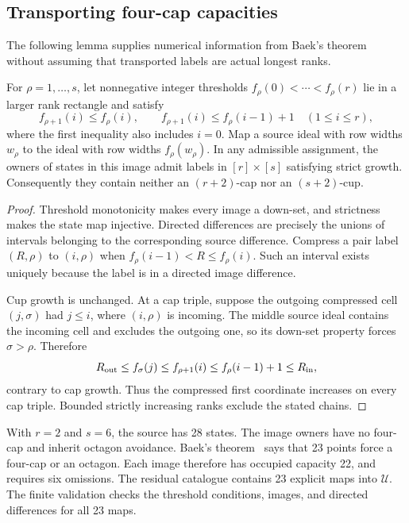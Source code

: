 \subsection{Transporting four-cap capacities}\label{sec:compression}
The following lemma supplies numerical information from Baek's theorem
without assuming that transported labels are actual longest ranks.

\begin{lemma}\label{lem:compression}
For $\rho=1,\ldots,s$, let nonnegative integer thresholds
$f_\rho(0)<\cdots<f_\rho(r)$ lie in a larger rank rectangle and satisfy
\[
 f_{\rho+1}(i)\le f_\rho(i),\qquad
 f_{\rho+1}(i)\le f_\rho(i-1)+1\quad(1\le i\le r),
\]
where the first inequality also includes $i=0$. Map a source ideal
with row widths $w_\rho$ to the ideal with row widths $f_\rho(w_\rho)$.
In any admissible assignment, the owners of states in this image
admit labels in $[r]\times[s]$ satisfying strict growth. Consequently
they contain neither an $(r+2)$-cap nor an $(s+2)$-cup.
\end{lemma}
\begin{proof}
Threshold monotonicity makes every image a down-set, and strictness
makes the state map injective. Directed differences are precisely the
unions of intervals belonging to the corresponding source difference.
Compress a pair label $(R,\rho)$ to $(i,\rho)$ when
$f_\rho(i-1)<R\le f_\rho(i)$. Such an interval exists uniquely because
the label is in a directed image difference.

Cup growth is unchanged. At a cap triple, suppose the outgoing
compressed cell $(j,\sigma)$ had $j\le i$, where $(i,\rho)$ is incoming.
The middle source ideal contains the incoming cell and excludes the
outgoing one, so its down-set property forces $\sigma>\rho$. Therefore
\[
 R_{\rm out}\le f_\sigma(j)\le f_{\rho+1}(i)
 \le f_\rho(i-1)+1\le R_{\rm in},
\]
contrary to cap growth. Thus the compressed first coordinate increases
on every cap triple. Bounded strictly increasing ranks exclude the
stated chains.
\end{proof}

With $r=2$ and $s=6$, the source has 28 states. The image owners have
no four-cap and inherit octagon avoidance. Baek's
theorem~\cite[Theorem~1.6]{Baek} says that 23 points force a four-cap
or an octagon. Each image therefore has occupied capacity 22, and
requires six omissions. The residual catalogue contains 23 explicit
maps into $\mathcal U$. The finite validation checks the threshold conditions, images,
and directed differences for all 23 maps.

